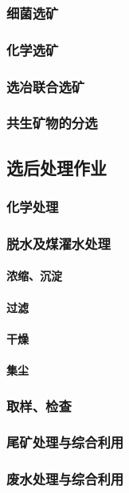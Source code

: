 \documentclass[UTF8]{../../ApplicationUniverse}
\begin{document}
        \subsubsection{细菌选矿}
        \subsubsection{化学选矿}
        \subsubsection{选冶联合选矿}
        \subsubsection{共生矿物的分选}
    \subsection{选后处理作业}
        \subsubsection{化学处理}
        \subsubsection{脱水及煤濯水处理}
            \paragraph{浓缩、沉淀}
            \paragraph{过滤}
            \paragraph{干燥}
            \paragraph{集尘}
        \subsubsection{取样、检查}
        \subsubsection{尾矿处理与综合利用}
        \subsubsection{废水处理与综合利用}
\end{document}
